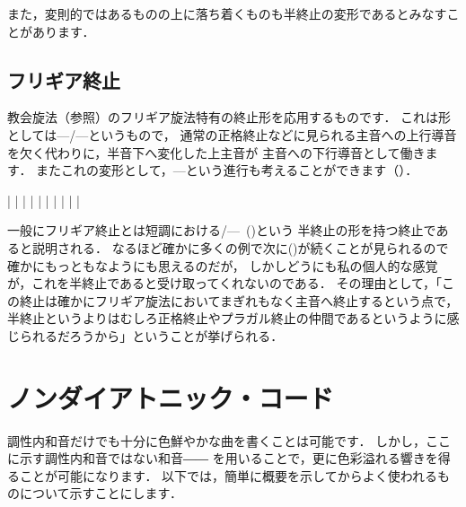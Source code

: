 \documentclass[dvipdfmx,uplatex,b5paper,openany,jbase=12Q,nomag*,textwidth-limit=44%
               ]{gachimuchi}
\begin{document}
また，変則的ではあるものの\Gniv 上に落ち着くものも半終止の変形であるとみなすことがあります．

\section{フリギア終止}
教会旋法（参照）のフリギア旋法特有の終止形を応用するものです．
これは形としては\Gniv\Min---\bFlat\Gnvii\Min/\bFlat\Gnii---\Gni というもので，
通常の正格終止などに見られる主音への上行導音を欠く代わりに，半音下へ変化した上主音が
主音への下行導音として働きます．
またこれの変形として，\bFlat\Gnii---\Gni という進行も考えることができます（）．

\begin{Music}[.6\linewidth]
  \generalmeter{\meterC}%
  \Startpiece%
  \NOTEs%
  |%
  \en\bar%
  \NOTEs%
  |%
  \en\bar%
  \NOTEs%
  |%
  \en\doublebar%
  \NOTEs%
  |%
  \en\bar%
  \NOTEs%
  |%
  \en\bar%
  \NOTEs%
  |%
  \en\setdoublebar%
  \endpiece%
\end{Music}

\begin{FGN}
一般にフリギア終止とは短調における\Gniv\Min/\bFlat\Gnvi---\Gnv\ ()という
半終止の形を持つ終止であると説明される．
なるほど確かに多くの例で次に\Gni(\Min)が続くことが見られるので確かにもっともなようにも思えるのだが，
しかしどうにも私の個人的な感覚が，これを半終止であると受け取ってくれないのである．
その理由として，「この終止は確かにフリギア旋法においてまぎれもなく主音へ終止するという点で，
半終止というよりはむしろ正格終止やプラガル終止の仲間であるというように感じられるだろうから」ということが挙げられる．
\end{FGN}

\chapter{ノンダイアトニック・コード}
調性内和音だけでも十分に色鮮やかな曲を書くことは可能です．%
しかし，ここに示す調性内和音ではない和音――%
を用いることで，更に色彩溢れる響きを得ることが可能になります．
以下では，簡単に概要を示してからよく使われるものについて示すことにします．
\end{document}
